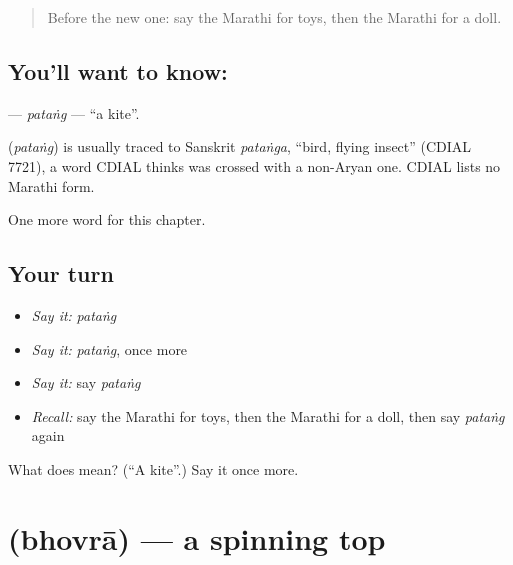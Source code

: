 \label{lesson:MR-C249-patang}



\begin{quote}
Before the new one: say the Marathi for toys, then the Marathi for a doll.
\end{quote}

\subsection*{You'll want to know: }
\textbf{} — \emph{pataṅg} — \textquotedblleft{}a kite\textquotedblright{}.

\begin{cousinweb}
\textbf{} (\emph{pataṅg}) is usually traced to Sanskrit \emph{pataṅga}, \textquotedblleft{}bird, flying insect\textquotedblright{} (CDIAL 7721), a word CDIAL thinks was crossed with a non-Aryan one. CDIAL lists no Marathi form.
\end{cousinweb}

\begin{grammarlens}[title={What you've built}]
One more word for this chapter.
\end{grammarlens}

\subsection*{Your turn}
\begin{itemize}
\raggedright
  \item \emph{Say it:} \emph{pataṅg}
  \item \emph{Say it:} \emph{pataṅg}, once more
  \item \emph{Say it:} say \emph{pataṅg}
  \item \emph{Recall:} say the Marathi for toys, then the Marathi for a doll, then say \emph{pataṅg} again
\end{itemize}

\begin{tcolorbox}[breakable,colback=teal!4,colframe=teal!35!black,title={Before you move on}]
What does  mean? (\textquotedblleft{}A kite\textquotedblright{}.) Say it once more.
\end{tcolorbox}
\section[\texorpdfstring{\mr{भोवरा} (bhovrā)}{भोवरा (bhovrā)}]{ (bhovrā) — a spinning top}

